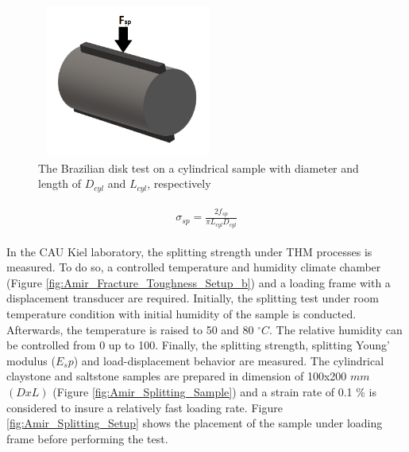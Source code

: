 \begin{figure}[!ht]
\centering
\includegraphics[width=6cm,height=5cm]{figures/Amir_Splitting_Theory.png}
\caption{The Brazilian disk test on a cylindrical sample with diameter and length of $D_{cyl}$ and $L_{cyl}$, respectively}
\label{fig:Amir_Splitting_Theory}
\end{figure} 

\begin{align}
\label{eq:Splitting_Strength}
\begin{split}
\sigma_{sp}=\frac{2f_{sp}}{\pi L_{cyl}D_{cyl}}
\end{split}
\end{align}

In the CAU Kiel laboratory, the splitting strength under THM processes is measured. To do so, a controlled temperature and humidity climate chamber (Figure \ref{fig:Amir_Fracture_Toughness_Setup_b}) and a loading frame with a displacement transducer are required. Initially, the splitting test under room temperature condition with initial humidity of the sample is conducted. Afterwards, the temperature is raised to 50 and 80 $^{\circ}C$. The relative humidity can be controlled from 0 up to 100. Finally, the splitting strength, splitting Young’ modulus ($E_sp$) and load-displacement behavior are measured. The cylindrical claystone and saltstone samples are prepared in dimension of 100x200 $mm$ $(DxL)$ (Figure \ref{fig:Amir_Splitting_Sample}) and a strain rate of  0.1 \% is considered to insure a relatively fast loading rate. Figure \ref{fig:Amir_Splitting_Setup} shows the placement of the sample under loading frame before performing the test.

